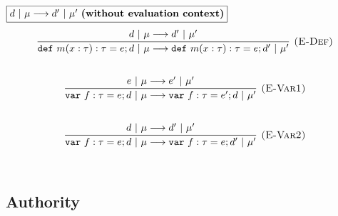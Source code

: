 \documentclass{llncs}
\newcommand{\keywadj}[1]{\mathtt{#1}}
\newcommand{\keyw}[1]{\keywadj{#1}~}
\begin{document}
$\fbox{$d~|~\mu \longrightarrow d'~|~\mu'$ \textbf{(without evaluation context)}}$
\[
\begin{array}{c}
\infer[\textsc{(E-Def)}]
  {\keyw{def} m(x:\tau):\tau = e; d~|~\mu \longrightarrow \keyw{def} m(x:\tau):\tau = e; d'~|~\mu'}
  {d~|~\mu \longrightarrow d'~|~\mu'}\\[5ex] 

\infer[\textsc{(E-Var1)}]
  {\keyw{var} f:\tau = e; d~|~\mu \longrightarrow \keyw{var} f:\tau = e'; d~|~\mu'}
  {e~|~\mu \longrightarrow e'~|~\mu'}\\[5ex] 

\infer[\textsc{(E-Var2)}]
  {\keyw{var} f:\tau = e; d~|~\mu \longrightarrow \keyw{var} f:\tau = e; d'~|~\mu'}
  {d~|~\mu \longrightarrow d'~|~\mu'}\\[5ex] 
\end{array}
\]


\newpage

\subsection{Authority}
\end{document}
